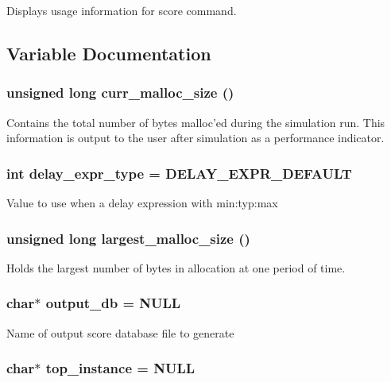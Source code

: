 Displays usage information for score command. 

\subsection{Variable Documentation}
\subsubsection{\setlength{\rightskip}{0pt plus 5cm}unsigned long curr\_\-malloc\_\-size ()}\label{score_8c_a6}


Contains the total number of bytes malloc'ed during the simulation run. This information is output to the user after simulation as a performance indicator. 
\subsubsection{\setlength{\rightskip}{0pt plus 5cm}int delay\_\-expr\_\-type = DELAY\_\-EXPR\_\-DEFAULT}\label{score_8c_a4}


Value to use when a delay expression with min:typ:max 
\subsubsection{\setlength{\rightskip}{0pt plus 5cm}unsigned long largest\_\-malloc\_\-size ()}\label{score_8c_a5}


Holds the largest number of bytes in allocation at one period of time. 
\subsubsection{\setlength{\rightskip}{0pt plus 5cm}char$\ast$ output\_\-db = NULL}\label{score_8c_a2}


Name of output score database file to generate 
\subsubsection{\setlength{\rightskip}{0pt plus 5cm}char$\ast$ top\_\-instance = NULL}\label{score_8c_a1}



